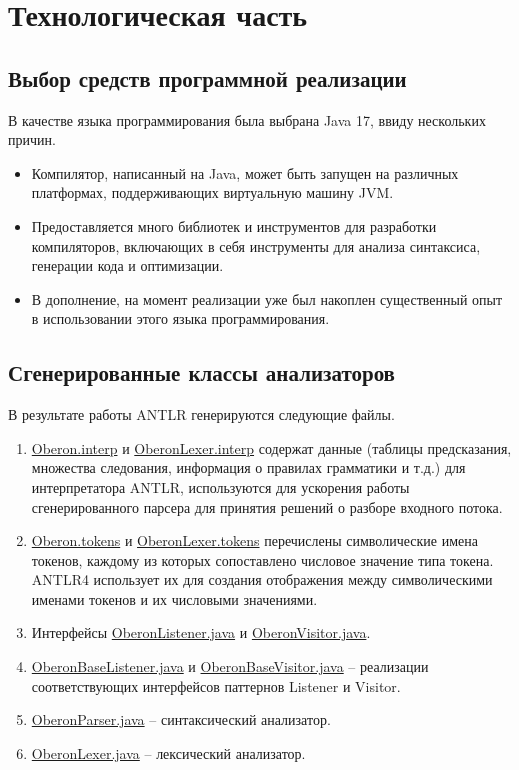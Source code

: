 \section{Технологическая часть}
\subsection{Выбор средств программной реализации}
В качестве языка программирования была выбрана Java 17, ввиду нескольких причин.
\begin{itemize}
	\item Компилятор, написанный на Java, может быть запущен на различных платформах, поддерживающих виртуальную машину JVM.
	
	\item Предоставляется много библиотек и инструментов для разработки компиляторов, включающих в себя инструменты для анализа синтаксиса, генерации кода и оптимизации.
	
	\item В дополнение, на момент реализации уже был накоплен существенный опыт в
	использовании этого языка программирования. \\
\end{itemize}

\subsection{Сгенерированные классы анализаторов}
В результате работы ANTLR генерируются следующие файлы.
\begin{enumerate}
	\item \underline{Oberon.interp} и \underline{OberonLexer.interp} содержат данные (таблицы предсказания, множества следования, информация о правилах грамматики и т.д.) для интерпретатора ANTLR, используются для ускорения работы сгенерированного парсера для принятия решений о разборе входного потока.
	
	\item \underline{Oberon.tokens} и \underline{OberonLexer.tokens} перечислены символические имена токенов, каждому из которых сопоставлено числовое значение типа токена. ANTLR4 использует их для создания отображения между символическими именами токенов и их числовыми значениями.
	
	\item Интерфейсы \underline{OberonListener.java} и \underline{OberonVisitor.java}.
	
	\item \underline{OberonBaseListener.java} и \underline{OberonBaseVisitor.java} -- реализации соответствующих интерфейсов паттернов Listener и Visitor.
	
	\item \underline{OberonParser.java} -- синтаксический анализатор.
	
	\item \underline{OberonLexer.java} -- лексический анализатор. \\
\end{enumerate}


